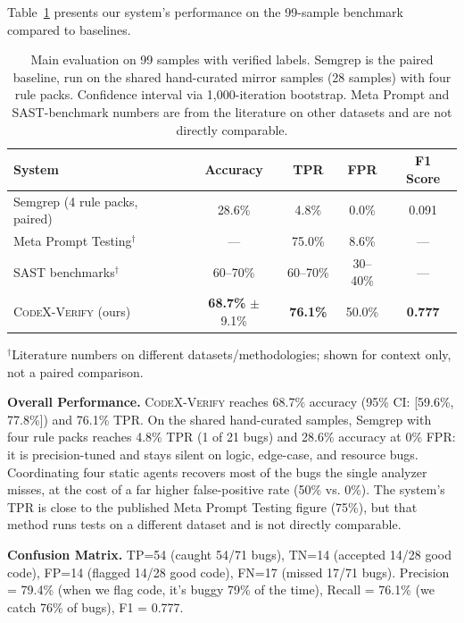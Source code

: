 \documentclass[10pt,twocolumn]{article}
\begin{document}
Table~\ref{tab:main_results} presents our system's performance on the 99-sample benchmark compared to baselines.

\begin{table}[t]
\centering
\caption{Main evaluation on 99 samples with verified labels. Semgrep is the paired baseline, run on the shared hand-curated mirror samples (28 samples) with four rule packs. Confidence interval via 1,000-iteration bootstrap. Meta Prompt and SAST-benchmark numbers are from the literature on other datasets and are not directly comparable.}
\label{tab:main_results}
\small
\begin{tabular}{@{}lcccc@{}}
\toprule
\textbf{System} & \textbf{Accuracy} & \textbf{TPR} & \textbf{FPR} & \textbf{F1 Score} \\
\midrule
Semgrep (4 rule packs, paired) & 28.6\% & 4.8\% & 0.0\% & 0.091 \\
\midrule
Meta Prompt Testing$^{\dagger}$ & --- & 75.0\% & 8.6\% & --- \\
SAST benchmarks$^{\dagger}$ & 60--70\% & 60--70\% & 30--40\% & --- \\
\midrule
\textsc{CodeX-Verify} (ours) & \textbf{68.7\%} $\pm$ 9.1\% & \textbf{76.1\%} & 50.0\% & \textbf{0.777} \\
\bottomrule
\end{tabular}
\vspace{1mm}
\footnotesize{$^{\dagger}$Literature numbers on different datasets/methodologies; shown for context only, not a paired comparison.}
\end{table}

\textbf{Overall Performance.} \textsc{CodeX-Verify} reaches 68.7\% accuracy (95\% CI: [59.6\%, 77.8\%]) and 76.1\% TPR. On the shared hand-curated samples, Semgrep with four rule packs reaches 4.8\% TPR (1 of 21 bugs) and 28.6\% accuracy at 0\% FPR: it is precision-tuned and stays silent on logic, edge-case, and resource bugs. Coordinating four static agents recovers most of the bugs the single analyzer misses, at the cost of a far higher false-positive rate (50\% vs. 0\%). The system's TPR is close to the published Meta Prompt Testing figure (75\%), but that method runs tests on a different dataset and is not directly comparable.

\textbf{Confusion Matrix.} TP=54 (caught 54/71 bugs), TN=14 (accepted 14/28 good code), FP=14 (flagged 14/28 good code), FN=17 (missed 17/71 bugs). Precision = 79.4\% (when we flag code, it's buggy 79\% of the time), Recall = 76.1\% (we catch 76\% of bugs), F1 = 0.777.
\end{document}
